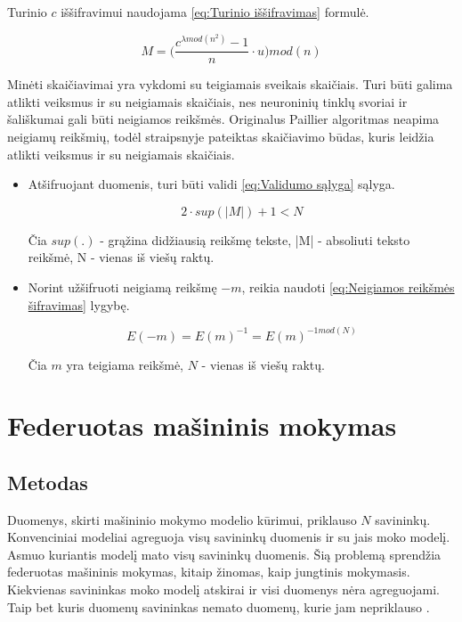 \documentclass{VUMIFInfBakalaurinis}
\begin{document}
\par Turinio $c$ iššifravimui naudojama \eqref{eq:Turinio iššifravimas} formulė.

\begin{equation}
    M = \Big(\frac{c^{\lambda mod (n^{2})} - 1}{n} \cdot u\Big) mod (n)
    \label{eq:Turinio iššifravimas}
\end{equation}

\par Minėti skaičiavimai yra vykdomi su teigiamais sveikais skaičiais. Turi būti galima atlikti veiksmus ir su neigiamais skaičiais, nes neuroninių tinklų svoriai ir šališkumai gali būti neigiamos reikšmės. Originalus Paillier algoritmas neapima neigiamų reikšmių, todėl \cite{16} straipsnyje pateiktas skaičiavimo būdas, kuris leidžia atlikti veiksmus ir su neigiamais skaičiais.

\begin{itemize}
    \item Atšifruojant duomenis, turi būti validi \eqref{eq:Validumo sąlyga} sąlyga.
    
    \begin{equation}
        2 \cdot sup(|M|) + 1 < N
        \label{eq:Validumo sąlyga}
    \end{equation}

    Čia $sup(.)$ - grąžina didžiausią reikšmę tekste, |M| - absoliuti teksto reikšmė, N - vienas iš viešų raktų.
    \item Norint užšifruoti neigiamą reikšmę $-m$, reikia naudoti \eqref{eq:Neigiamos reikšmės šifravimas} lygybę.
    
    \begin{equation}
        E(-m) = E(m)^{-1} = E(m)^{-1 mod(N)}
        \label{eq:Neigiamos reikšmės šifravimas}
    \end{equation}
    
    Čia $m$ yra teigiama reikšmė, $N$ - vienas iš viešų raktų.
\end{itemize}

\section{Federuotas mašininis mokymas}
\subsection{Metodas}
\par Duomenys, skirti mašininio mokymo modelio kūrimui, priklauso $N$ savininkų. Konvenciniai modeliai agreguoja visų savininkų duomenis ir su jais moko modelį. Asmuo kuriantis modelį mato visų savininkų duomenis. Šią problemą sprendžia federuotas mašininis mokymas, kitaip žinomas, kaip jungtinis mokymasis. Kiekvienas savininkas moko modelį atskirai ir visi duomenys nėra agreguojami. Taip bet kuris duomenų savininkas nemato duomenų, kurie jam nepriklauso \cite{18}.
\end{document}
